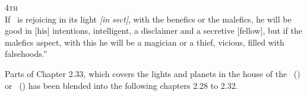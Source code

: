 \noindent\textsc{4th} \hfill \\
\indent If \Mercury\, is rejoicing in its light \textsl{[in sect]}, with the benefics or the malefics, he will be good in [his] intentions, intelligent, a disclaimer and a secretive [fellow], but if the malefics aspect, with this he will be a magician or a thief, vicious, filled with falsehoods.''

\begin{mdframed}[backgroundcolor=cyan!5, rightmargin=1em, leftmargin=1em]
Parts of Chapter 2.33, which covers the lights and planets in the house of the \Moon\, (\Cancer) or \Sun\, (\Leo) has been blended into the following chapters 2.28 to 2.32.
\end{mdframed}



